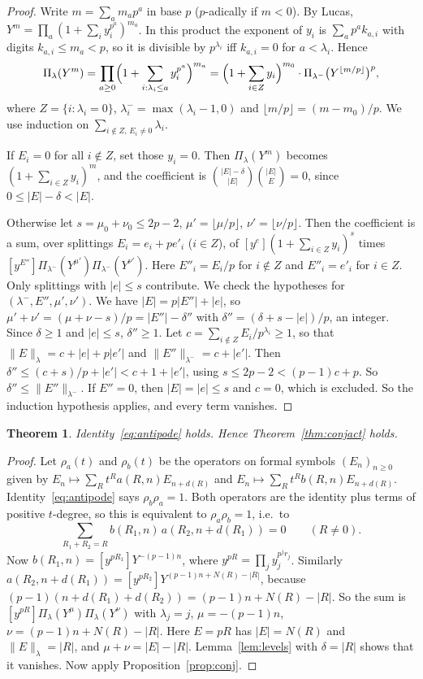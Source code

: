 \documentclass[11pt]{amsart}
\newtheorem{theorem}{Theorem}[section]
\theoremstyle{definition}
\theoremstyle{remark}
\newcommand{\coef}[1]{\left[#1\right]}
\begin{document}
\begin{proof}
Write $m=\sum_am_ap^a$ in base $p$ ($p$-adically if $m<0$).  By Lucas,
$Y^m=\prod_a(1+\sum_iy_i^{p^a})^{m_a}$.  In this product the exponent of $y_i$ is
$\sum_ap^ak_{a,i}$ with digits $k_{a,i}\le m_a<p$, so it is divisible by
$p^{\lambda_i}$ iff $k_{a,i}=0$ for $a<\lambda_i$.  Hence
\[
  \Pi_\lambda(Y^m)=\prod_{a\ge0}\Bigl(1+\sum_{i:\lambda_i\le a}y_i^{p^a}\Bigr)^{m_a}
  =\Bigl(1+\sum_{i\in Z}y_i\Bigr)^{m_0}\cdot\Pi_{\lambda^-}\bigl(Y^{\lfloor m/p\rfloor}\bigr)^p,
\]
where $Z=\{i:\lambda_i=0\}$, $\lambda^-_i=\max(\lambda_i-1,0)$ and
$\lfloor m/p\rfloor=(m-m_0)/p$.  We use induction on
$\sum_{i\notin Z,\,E_i\ne0}\lambda_i$.

If $E_i=0$ for all $i\notin Z$, set those $y_i=0$.  Then
$\Pi_\lambda(Y^m)$ becomes $(1+\sum_{i\in Z}y_i)^m$, and the coefficient is
$\binom{|E|-\delta}{|E|}\binom{|E|}{E}=0$, since $0\le|E|-\delta<|E|$.

Otherwise let $s=\mu_0+\nu_0\le2p-2$, $\mu'=\lfloor\mu/p\rfloor$,
$\nu'=\lfloor\nu/p\rfloor$.  Then the coefficient is a sum, over splittings
$E_i=e_i+pe'_i$ ($i\in Z$), of $\coef{y^e}(1+\sum_{i\in Z}y_i)^s$ times
$\coef{y^{E''}}\Pi_{\lambda^-}(Y^{\mu'})\Pi_{\lambda^-}(Y^{\nu'})$.  Here
$E''_i=E_i/p$ for $i\notin Z$ and $E''_i=e'_i$ for $i\in Z$.  Only splittings
with $|e|\le s$ contribute.  We check the hypotheses for $(\lambda^-,E'',\mu',\nu')$.
We have $|E|=p|E''|+|e|$, so $\mu'+\nu'=(\mu+\nu-s)/p=|E''|-\delta''$ with
$\delta''=(\delta+s-|e|)/p$, an integer.  Since $\delta\ge1$ and $|e|\le s$,
$\delta''\ge1$.  Let $c=\sum_{i\notin Z}E_i/p^{\lambda_i}\ge1$, so that
$\|E\|_\lambda=c+|e|+p|e'|$ and $\|E''\|_{\lambda^-}=c+|e'|$.  Then
$\delta''\le(c+s)/p+|e'|<c+1+|e'|$, using $s\le2p-2<(p-1)c+p$.  So
$\delta''\le\|E''\|_{\lambda^-}$.  If $E''=0$, then $|E|=|e|\le s$ and $c=0$,
which is excluded.  So the induction hypothesis applies, and every term
vanishes.
\end{proof}

\begin{theorem}\label{thm:conjall}
Identity~\eqref{eq:antipode} holds.  Hence Theorem~\ref{thm:conjact} holds.
\end{theorem}

\begin{proof}
Let $\rho_a(t)$ and $\rho_b(t)$ be the operators on formal symbols
$(E_n)_{n\ge0}$ given by $E_n\mapsto\sum_Rt^Ra(R,n)E_{n+d(R)}$ and
$E_n\mapsto\sum_Rt^Rb(R,n)E_{n+d(R)}$.  Identity~\eqref{eq:antipode} says
$\rho_b\rho_a=1$.  Both operators are the identity plus terms of positive
$t$-degree, so this is equivalent to $\rho_a\rho_b=1$, i.e.\ to
\[
  \sum_{R_1+R_2=R}b(R_1,n)\,a(R_2,n+d(R_1))=0\qquad(R\ne0).
\]
Now $b(R_1,n)=\coef{y^{pR_1}}Y^{-(p-1)n}$, where
$y^{pR}=\prod_jy_j^{p^jr_j}$.  Similarly
$a(R_2,n+d(R_1))=\coef{y^{pR_2}}Y^{(p-1)n+N(R)-|R|}$, because
$(p-1)(n+d(R_1)+d(R_2))=(p-1)n+N(R)-|R|$.  So the sum is
$\coef{y^{pR}}\Pi_\lambda(Y^\mu)\Pi_\lambda(Y^\nu)$ with $\lambda_j=j$,
$\mu=-(p-1)n$, $\nu=(p-1)n+N(R)-|R|$.  Here $E=pR$ has $|E|=N(R)$ and
$\|E\|_\lambda=|R|$, and $\mu+\nu=|E|-|R|$.  Lemma~\ref{lem:levels} with
$\delta=|R|$ shows that it vanishes.  Now apply Proposition~\ref{prop:conj}.
\end{proof}
\end{document}
